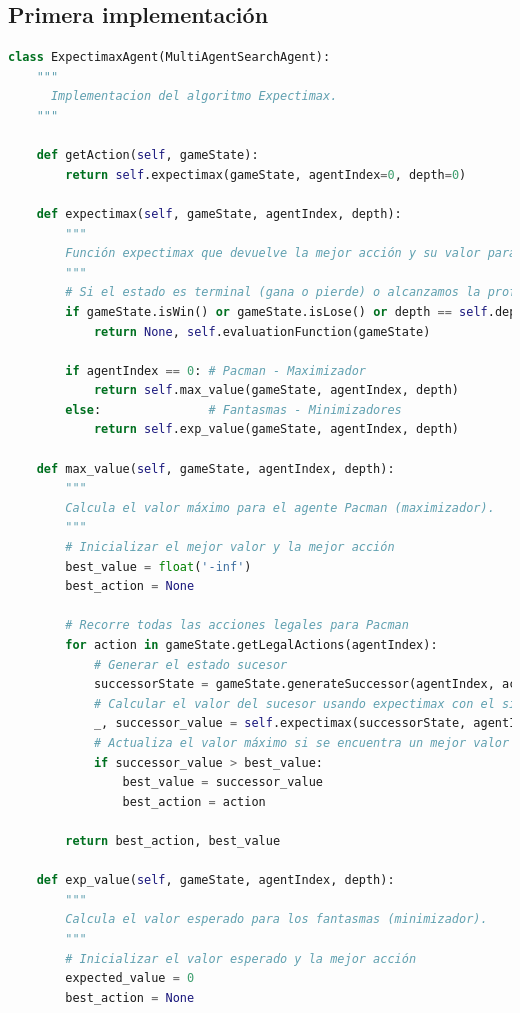 \documentclass{report}
\begin{document}
        \subsection*{Primera implementación}
          \begin{lstlisting}[language=Python, caption=Implementación inicial del agente Expectimax]
class ExpectimaxAgent(MultiAgentSearchAgent):
    """
      Implementacion del algoritmo Expectimax.
    """

    def getAction(self, gameState):
        return self.expectimax(gameState, agentIndex=0, depth=0)
    
    def expectimax(self, gameState, agentIndex, depth):
        """
        Función expectimax que devuelve la mejor acción y su valor para el agente actual.
        """
        # Si el estado es terminal (gana o pierde) o alcanzamos la profundidad máxima, evaluamos el estado
        if gameState.isWin() or gameState.isLose() or depth == self.depth:
            return None, self.evaluationFunction(gameState)

        if agentIndex == 0: # Pacman - Maximizador
            return self.max_value(gameState, agentIndex, depth)
        else:               # Fantasmas - Minimizadores
            return self.exp_value(gameState, agentIndex, depth)
        
    def max_value(self, gameState, agentIndex, depth):
        """
        Calcula el valor máximo para el agente Pacman (maximizador).
        """
        # Inicializar el mejor valor y la mejor acción
        best_value = float('-inf')
        best_action = None

        # Recorre todas las acciones legales para Pacman
        for action in gameState.getLegalActions(agentIndex):
            # Generar el estado sucesor
            successorState = gameState.generateSuccessor(agentIndex, action)
            # Calcular el valor del sucesor usando expectimax con el siguiente agente
            _, successor_value = self.expectimax(successorState, agentIndex + 1, depth)
            # Actualiza el valor máximo si se encuentra un mejor valor
            if successor_value > best_value:
                best_value = successor_value
                best_action = action

        return best_action, best_value
    
    def exp_value(self, gameState, agentIndex, depth):
        """
        Calcula el valor esperado para los fantasmas (minimizador).
        """
        # Inicializar el valor esperado y la mejor acción
        expected_value = 0
        best_action = None


\end{lstlisting}
\end{document}
